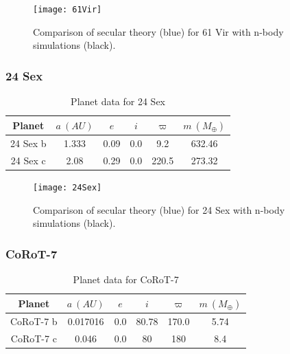 \documentclass[11pt, oneside]{article}   	%
\begin{document}
\begin{figure}[!h]
\begin{center}
\texttt{[image: 61Vir]}
\caption[]{Comparison of secular theory (blue) for 61 Vir with n-body simulations (black).}
\label{}
\end{center}
\end{figure}

\newpage

\subsubsection{24 Sex}

\begin{table}[!h]
\centering
\small
\label{my-label}
\begin{tabular}{|c|c|c|c|c|c|}
\hline
\rowcolor[HTML]{C0C0C0} 
Planet & $a \ (AU)$       & $e$     & $i$   & $\varpi$  & $m \ (M _{\oplus})$ \\ \hline
24 Sex b    & 1.333 & 0.09 & 0.0 & 9.2   & 632.46 \\ \hline
24 Sex c    & 2.08  & 0.29 & 0.0 & 220.5 & 273.32 \\ \hline
\end{tabular}
\caption{Planet data for 24 Sex}
\end{table}

\begin{figure}[!h]
\begin{center}
\texttt{[image: 24Sex]}
\caption[]{Comparison of secular theory (blue) for 24 Sex with n-body simulations (black).}
\label{}
\end{center}
\end{figure}

\newpage


\subsubsection{CoRoT-7}

\begin{table}[!h]
\centering
\small
\label{my-label}
\begin{tabular}{|c|c|c|c|c|c|}
\hline
\rowcolor[HTML]{C0C0C0} 
Planet & $a \ (AU)$       & $e$     & $i$   & $\varpi$  & $m \ (M _{\oplus})$ \\ \hline
CoRoT-7 b    & 0.017016 & 0.0 & 80.78 & 170.0 & 5.74 \\ \hline
CoRoT-7 c    & 0.046    & 0.0 & 80    & 180   & 8.4  \\ \hline
\end{tabular}
\caption{Planet data for CoRoT-7}
\end{table}
\end{document}
